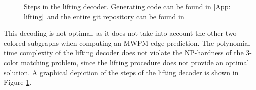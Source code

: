 \begin{figure}[h!]
    \centering
    \hfill
    \hfill
    \hfill
    \caption{Steps in the lifting decoder. Generating code can be found in \ref{App: lifting}\
    and the entire git repository can be found in \cite{clemens}}
    \label{fig: lifting}
\end{figure}
This decoding is not optimal, as it does not take into account the other two colored
subgraphs when computing an MWPM edge prediction.
The polynomial time complexity of the lifting decoder does not
violate the NP-hardness of the 3-color matching problem, since the 
lifting procedure does not provide an optimal solution.
A graphical depiction of the steps of the lifting decoder is shown in
Figure \ref{fig: lifting}.
\newpage